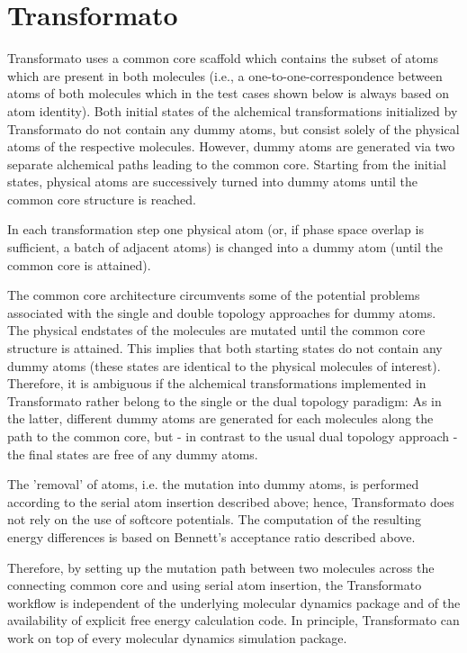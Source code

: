 \chapter{Transformato }

Transformato uses a common core scaffold which contains the subset of atoms which are present in both molecules (i.e., a one-to-one-correspondence between
atoms of both molecules which in the test cases shown below is always
based on atom identity). Both initial states of the alchemical transformations initialized by Transformato do not contain any dummy atoms, but consist solely of the physical atoms of the respective molecules. However, dummy atoms are generated via two separate alchemical paths leading to the common core. Starting from the initial states, physical atoms are successively turned into dummy atoms until the common core structure is reached. 

In each transformation step one physical atom (or, if phase space
overlap is sufficient, a batch of adjacent atoms) is changed into
a dummy atom (until the common core is attained).

The common core architecture circumvents some of the potential problems
associated with the single and double topology approaches for dummy
atoms. The physical endstates of the molecules are mutated until the
common core structure is attained. This implies that both starting states
do not contain any dummy atoms (these states are identical to the
physical molecules of interest). Therefore, it is ambiguous if the
alchemical transformations implemented in Transformato rather belong
to the single or the dual topology paradigm: As in the latter, different
dummy atoms are generated for each molecules along the path to the
common core, but - in contrast to the usual dual topology approach
- the final states are free of any dummy atoms. 

The 'removal' of atoms, i.e. the mutation into dummy atoms, is performed
according to the serial atom insertion described above; hence, Transformato
does not rely on the use of softcore potentials. The computation
of the resulting energy differences is based on Bennett's acceptance
ratio described above.

Therefore, by setting up the mutation path between two molecules across
the connecting common core and using serial atom
insertion, the Transformato workflow is independent of the underlying
molecular dynamics package and of the availability of explicit free energy
calculation code. In principle, Transformato can work on top of every
molecular dynamics simulation package.

